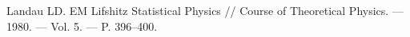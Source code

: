 \documentclass[pdf,hyperref={unicode}]{beamer}
\begin{document}
\begin{frame}
\begin{columns}
\begin{column}{0.55\linewidth}
\end{column}

\end{columns}
\vspace{2mm}
\tiny{
Landau LD. EM Lifshitz Statistical Physics // Course of Theoretical
Physics. –– 1980. –– Vol. 5. –– P. 396–400.
}

\end{frame}





\begin{frame}
\transdissolve[duration=0.2]

\begin{columns}

\begin{column}{0.6\linewidth}


\end{column}
\end{columns}
\end{frame}
\end{document}
